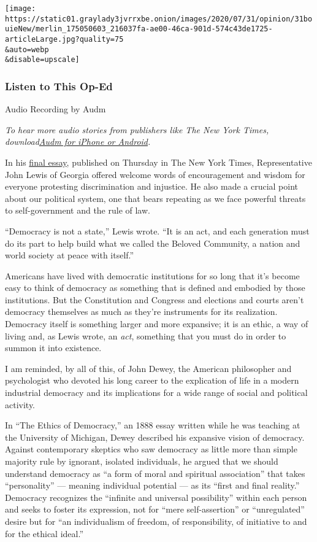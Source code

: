 \texttt{[image: https://static01.graylady3jvrrxbe.onion/images/2020/07/31/opinion/31bouieNew/merlin\_175050603\_216037fa-ae00-46ca-901d-574c43de1725-articleLarge.jpg?quality=75\\\&auto=webp\\\&disable=upscale]}

\hypertarget{listen-to-this-op-ed}{%
\subsubsection{Listen to This Op-Ed}\label{listen-to-this-op-ed}}

Audio Recording by Audm

\emph{To hear more audio stories from publishers like The New York
Times,
download}\href{https://www.audm.com/?utm_source=nytopinion\&utm_medium=embed\&utm_campaign=trump_democracy_lewis}{\emph{Audm
for iPhone or Android}}\emph{.}

In his
\href{https://www.nytimes3xbfgragh.onion/2020/07/30/opinion/john-lewis-civil-rights-america.html}{final
essay}, published on Thursday in The New York Times, Representative John
Lewis of Georgia offered welcome words of encouragement and wisdom for
everyone protesting discrimination and injustice. He also made a crucial
point about our political system, one that bears repeating as we face
powerful threats to self-government and the rule of law.

``Democracy is not a state,'' Lewis wrote. ``It is an act, and each
generation must do its part to help build what we called the Beloved
Community, a nation and world society at peace with itself.''

Americans have lived with democratic institutions for so long that it's
become easy to think of democracy as something that is defined and
embodied by those institutions. But the Constitution and Congress and
elections and courts aren't democracy themselves as much as they're
instruments for its realization. Democracy itself is something larger
and more expansive; it is an ethic, a way of living and, as Lewis wrote,
an \emph{act}, something that you must do in order to summon it into
existence.

I am reminded, by all of this, of John Dewey, the American philosopher
and psychologist who devoted his long career to the explication of life
in a modern industrial democracy and its implications for a wide range
of social and political activity.

In ``The Ethics of Democracy,'' an 1888 essay written while he was
teaching at the University of Michigan, Dewey described his expansive
vision of democracy. Against contemporary skeptics who saw democracy as
little more than simple majority rule by ignorant, isolated individuals,
he argued that we should understand democracy as ``a form of moral and
spiritual association'' that takes ``personality'' --- meaning
individual potential --- as its ``first and final reality.'' Democracy
recognizes the ``infinite and universal possibility'' within each person
and seeks to foster its expression, not for ``mere self-assertion'' or
``unregulated'' desire but for ``an individualism of freedom, of
responsibility, of initiative to and for the ethical ideal.''


